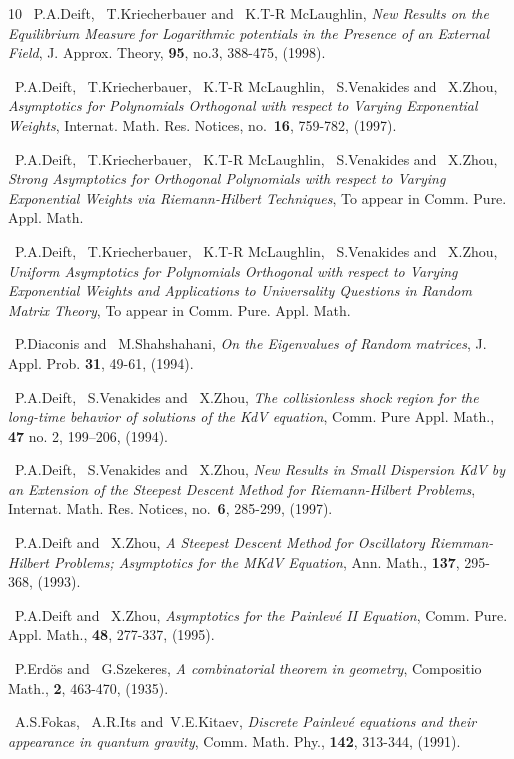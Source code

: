 \documentclass{amsart}
\theoremstyle{definition}
\theoremstyle{remark}
\numberwithin{equation}{section}
\begin{document}
\begin{thebibliography}{10}
~P.A.Deift, ~T.Kriecherbauer and ~K.T-R McLaughlin, 
\emph{New Results on the Equilibrium Measure for Logarithmic potentials 
in the Presence of an External Field}, J. Approx. Theory, 
\textbf{95}, no.3, 388-475, (1998).

~P.A.Deift, ~T.Kriecherbauer, ~K.T-R McLaughlin, ~S.Venakides 
and ~X.Zhou, \emph{Asymptotics for Polynomials Orthogonal with 
respect to Varying Exponential Weights}, Internat. Math. Res. 
Notices, no.~\textbf{16}, 759-782, (1997). 

~P.A.Deift, ~T.Kriecherbauer, ~K.T-R McLaughlin, ~S.Venakides
and ~X.Zhou, \emph{Strong Asymptotics for Orthogonal Polynomials with 
respect to Varying Exponential Weights via Riemann-Hilbert 
Techniques}, To appear in Comm. Pure. Appl. Math.

~P.A.Deift, ~T.Kriecherbauer, ~K.T-R McLaughlin, ~S.Venakides
and ~X.Zhou, \emph{Uniform Asymptotics for Polynomials Orthogonal with 
respect to Varying Exponential Weights and Applications to 
Universality Questions in Random Matrix Theory}, 
To appear in Comm. Pure. Appl. Math.

~P.Diaconis and ~M.Shahshahani, \emph{On the Eigenvalues of
Random matrices}, J. Appl. Prob. \textbf{31}, 49-61, (1994).

~P.A.Deift, ~S.Venakides and ~X.Zhou, \emph{The collisionless shock 
region for the long-time behavior of solutions of the
KdV equation}, Comm. Pure Appl. Math., \textbf{47} no. 2, 199--206, (1994).

~P.A.Deift, ~S.Venakides and ~X.Zhou, \emph{New Results in Small 
Dispersion KdV by an Extension of the Steepest Descent Method for 
Riemann-Hilbert Problems}, Internat. Math. Res.
Notices, no.~\textbf{6}, 285-299, (1997).

~P.A.Deift and ~X.Zhou, \emph{A Steepest Descent Method for 
Oscillatory Riemman-Hilbert Problems; Asymptotics for 
the MKdV Equation}, Ann. Math., \textbf{137}, 295-368, (1993).

~P.A.Deift and ~X.Zhou, \emph{Asymptotics for the Painlev\'e II  
Equation}, Comm. Pure. Appl. Math., \textbf{48}, 277-337, (1995).

~P.Erd\"os and ~G.Szekeres, \emph{A combinatorial theorem in geometry}, 
Compositio Math., \textbf{2}, 463-470, (1935).
 
~A.S.Fokas, ~A.R.Its and~V.E.Kitaev, \emph{Discrete Painlev\'e 
equations and their appearance in quantum gravity}, 
Comm. Math. Phy., \textbf{142}, 313-344, (1991).


\end{thebibliography}
\end{document}
